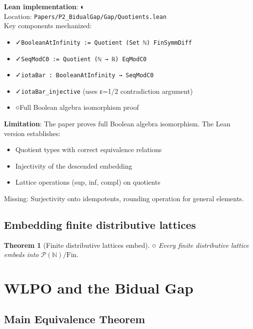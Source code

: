 \documentclass[11pt]{article}
\newtheorem{theorem}{Theorem}[section]
\theoremstyle{definition}
\theoremstyle{remark}
\newcommand{\leanok}{\textcolor{green!70!black}{✓}}
\newcommand{\leanpartial}{\textcolor{orange!70!black}{◐}}
\newcommand{\leanpending}{\textcolor{red!70!black}{○}}
\newcommand{\leanloc}[1]{\texttt{\footnotesize\color{blue!60!black}#1}}
\newcommand{\N}{\mathbb{N}}
\begin{document}
\begin{mdframed}[style=leanbox]
\textbf{Lean implementation}: \leanpartial\\
Location: \leanloc{Papers/P2\_BidualGap/Gap/Quotients.lean}\\
Key components mechanized:
\begin{itemize}
\item \leanok \texttt{BooleanAtInfinity := Quotient (Set ℕ) FinSymmDiff}
\item \leanok \texttt{SeqModC0 := Quotient (ℕ → ℝ) EqModC0}
\item \leanok \texttt{iotaBar : BooleanAtInfinity → SeqModC0}
\item \leanok \texttt{iotaBar\_injective} (uses ε=1/2 contradiction argument)
\item \leanpending Full Boolean algebra isomorphism proof
\end{itemize}

\textbf{Limitation}: The paper proves full Boolean algebra isomorphism. The Lean version establishes:
\begin{itemize}
\item Quotient types with correct equivalence relations
\item Injectivity of the descended embedding
\item Lattice operations (sup, inf, compl) on quotients
\end{itemize}
Missing: Surjectivity onto idempotents, rounding operation for general elements.
\end{mdframed}

\subsection{Embedding finite distributive lattices}

\begin{theorem}[Finite distributive lattices embed]\label{thm:finite-embed} \leanpending
Every finite distributive lattice embeds into \(\mathcal{P}(\N)/\mathrm{Fin}\).
\end{theorem}

\section{WLPO and the Bidual Gap}\label{sec:wlpo-gap}

\subsection{Main Equivalence Theorem}
\end{document}
